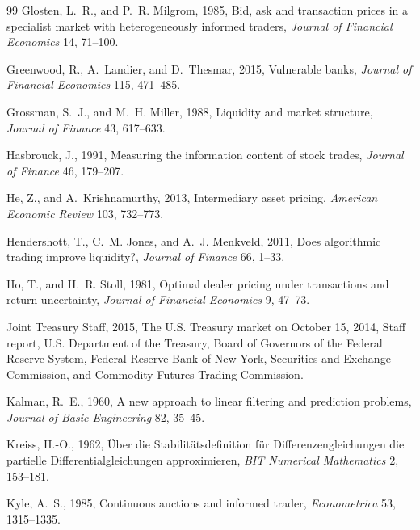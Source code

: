 \documentclass[12pt]{article}
\theoremstyle{definition}
\theoremstyle{remark}
\begin{document}
\begin{thebibliography}{99}
Glosten, L.~R., and P.~R. Milgrom, 1985, Bid, ask and transaction prices in a specialist market with heterogeneously informed traders, \emph{Journal of Financial Economics} 14, 71--100.

Greenwood, R., A.~Landier, and D.~Thesmar, 2015, Vulnerable banks, \emph{Journal of Financial Economics} 115, 471--485.

Grossman, S.~J., and M.~H. Miller, 1988, Liquidity and market structure, \emph{Journal of Finance} 43, 617--633.

Hasbrouck, J., 1991, Measuring the information content of stock trades, \emph{Journal of Finance} 46, 179--207.

He, Z., and A.~Krishnamurthy, 2013, Intermediary asset pricing, \emph{American Economic Review} 103, 732--773.

Hendershott, T., C.~M. Jones, and A.~J. Menkveld, 2011, Does algorithmic trading improve liquidity?, \emph{Journal of Finance} 66, 1--33.

Ho, T., and H.~R. Stoll, 1981, Optimal dealer pricing under transactions and return uncertainty, \emph{Journal of Financial Economics} 9, 47--73.

Joint Treasury Staff, 2015, The U.S. Treasury market on October 15, 2014, Staff report, U.S. Department of the Treasury, Board of Governors of the Federal Reserve System, Federal Reserve Bank of New York, Securities and Exchange Commission, and Commodity Futures Trading Commission.

Kalman, R.~E., 1960, A new approach to linear filtering and prediction problems, \emph{Journal of Basic Engineering} 82, 35--45.

Kreiss, H.-O., 1962, {\"U}ber die Stabilit{\"a}tsdefinition f{\"u}r Differenzengleichungen die partielle Differentialgleichungen approximieren, \emph{BIT Numerical Mathematics} 2, 153--181.

Kyle, A.~S., 1985, Continuous auctions and informed trader, \emph{Econometrica} 53, 1315--1335.


\end{thebibliography}
\end{document}

